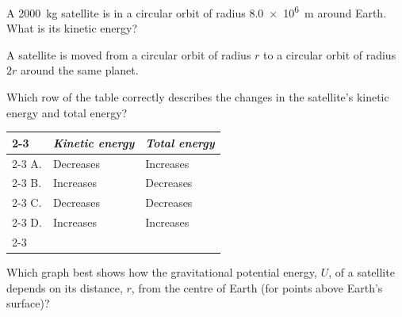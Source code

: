 \begin{quizq}{}
A \qty{2000}{kg} satellite is in a circular orbit of radius \qty{8.0e6}{m} around Earth. What is its
kinetic energy?
\end{quizq}

\begin{quizq}{}
A satellite is moved from a circular orbit of radius $r$ to a circular orbit of radius $2r$ around
the same planet.

Which row of the table correctly describes the changes in the satellite's kinetic energy and total
energy?
\begin{center}
  \renewcommand\arraystretch{1.7}
  \begin{tabular}{@{}p{10mm}|>{\centering\arraybackslash}p{45mm}|>{\centering\arraybackslash}p{45mm}|}
    \cline{2-3}
    & \textit{Kinetic energy} & \textit{Total energy}\\ \cline{2-3}
    A. & Decreases & Increases\\ \cline{2-3}
    B. & Increases & Decreases\\ \cline{2-3}
    C. & Decreases & Decreases\\ \cline{2-3}
    D. & Increases & Increases\\ \cline{2-3}
  \end{tabular}
\end{center}
\end{quizq}

\begin{quizq}{}
Which graph best shows how the gravitational potential energy, $U$, of a satellite depends on its
distance, $r$, from the centre of Earth (for points above Earth's surface)?
  {%
  }
  {%
  }
  {%
  }
\end{quizq}

